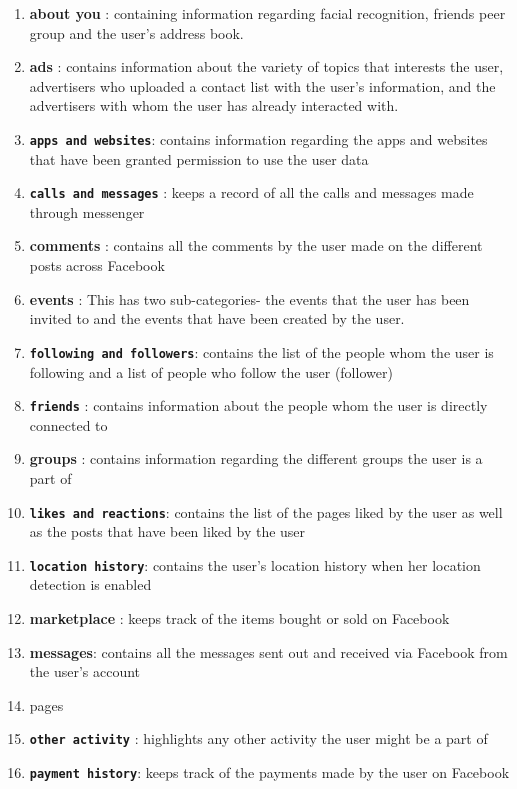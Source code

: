\begin{enumerate}[i]
   \item \textbf{about you }: containing information regarding facial recognition, friends peer group and the user's address book.
   \item \textbf{ads} : contains information about the variety of topics that interests the user, advertisers who uploaded a contact list with the user's information, and the advertisers with whom the user has already interacted with.
   \item \textbf{\texttt{apps and websites}}: contains information regarding the apps and websites that have been granted permission to use the user data
   \item \textbf{\texttt{calls and messages}} : keeps a record of all the calls and messages made through messenger
   \item \textbf{comments} : contains all the comments by the user made on the different posts across Facebook
   \item \textbf{events} : This has two sub-categories- the events that the user has been invited to and the events that have been created by the user.
   \item \textbf{\texttt{following and followers}}: contains the list of the people whom the user is following and a list of people who follow the user (follower)
   \item \textbf{\texttt{friends}} : contains information about the people whom the user is directly connected to
   \item \textbf{groups} : contains information regarding the different groups the user is a part of
   \item \textbf{\texttt{likes and reactions}}: contains the list of the pages liked by the user as well as the posts that have been liked by the user
   \item \textbf{\texttt{location history}}: contains the user's location history when her location detection is enabled
   \item \textbf{marketplace} : keeps track of the items bought or sold on Facebook
   \item \textbf{messages}: contains all the messages sent out and received via Facebook from the user's account
   \item pages
   \item \textbf{\texttt{other activity}} : highlights any other activity the user might be a part of
   \item \textbf{\texttt{payment history}}: keeps track of the payments made by the user on Facebook

\end{enumerate}
